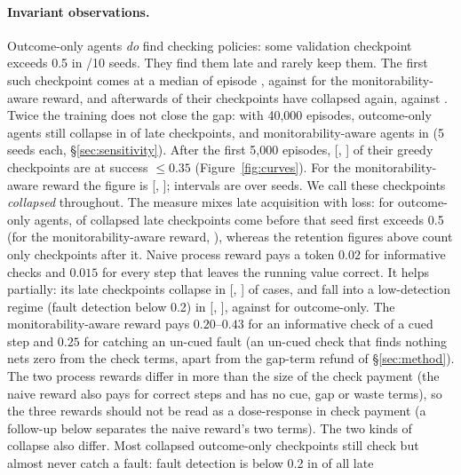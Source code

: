 \paragraph{Invariant observations.}
Outcome-only agents \emph{do} find checking policies: some validation checkpoint exceeds 0.5 in /10 seeds. They find them late and rarely keep them. The first such checkpoint comes at a median of episode , against  for the monitorability-aware reward, and afterwards  of their checkpoints have collapsed again, against . Twice the training does not close the gap: with 40{,}000 episodes, outcome-only agents still collapse in  of late checkpoints, and monitorability-aware agents in  (5 seeds each, \S\ref{sec:sensitivity}). After the first 5{,}000 episodes,  [, ] of their greedy checkpoints are at success $\le 0.35$ (Figure~\ref{fig:curves}). For the monitorability-aware reward the figure is  [, ]; intervals are over seeds. We call these checkpoints \emph{collapsed} throughout. The measure mixes late acquisition with loss: for outcome-only agents,  of collapsed late checkpoints come before that seed first exceeds 0.5 (for the monitorability-aware reward, ), whereas the retention figures above count only checkpoints after it. Naive process reward pays a token $0.02$ for informative checks and $0.015$ for every step that leaves the running value correct. It helps partially: its late checkpoints collapse in  [, ] of cases, and fall into a low-detection regime (fault detection below 0.2) in  [, ], against  for outcome-only. The monitorability-aware reward pays $0.20$--$0.43$ for an informative check of a cued step and $0.25$ for catching an un-cued fault (an un-cued check that finds nothing nets zero from the check terms, apart from the gap-term refund of \S\ref{sec:method}). The two process rewards differ in more than the size of the check payment (the naive reward also pays for correct steps and has no cue, gap or waste terms), so the three rewards should not be read as a dose-response in check payment (a follow-up below separates the naive reward's two terms). The two kinds of collapse also differ. Most collapsed outcome-only checkpoints still check but almost never catch a fault: fault detection is below 0.2 in  of all late 